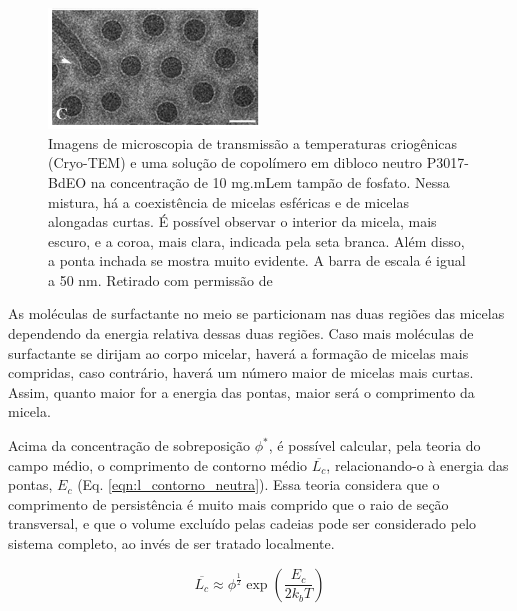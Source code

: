 		\begin{figure}[h]
			\centering
			\includegraphics[width=0.5\textwidth]{imagens/artigos/Cryo_TEM_Pontas_Danino_2009}
			\caption{Imagens de microscopia de transmissão a temperaturas criogênicas (Cryo-TEM) e uma solução de copolímero em dibloco neutro P3017-BdEO na concentração de 10 mg.mL\menosUm em tampão de fosfato. Nessa mistura, há a coexistência de micelas esféricas e de micelas alongadas curtas. É possível observar o interior da micela, mais escuro, e a coroa, mais clara, indicada pela seta branca. Além disso, a ponta inchada se mostra muito evidente. A barra de escala é igual a 50 nm. Retirado com permissão de %
		}
			\label{fig:pontas_inchadas_danino2009}
		\end{figure} 
				
		As moléculas de surfactante no meio se particionam nas duas regiões das micelas dependendo da energia relativa dessas duas regiões. Caso mais moléculas de surfactante se dirijam ao corpo micelar, haverá a formação de micelas mais compridas, caso contrário, haverá um número maior de micelas mais curtas. Assim, quanto maior for a energia das pontas, maior será o comprimento da micela.
		
		Acima da concentração de sobreposição \(\phi^*\), é possível calcular, pela teoria do campo médio, o comprimento de contorno médio \(\overline{L_c}\), relacionando-o à energia das pontas, \(E_c\) (Eq. \ref{eqn:l_contorno_neutra}). Essa teoria considera que o comprimento de persistência é muito mais comprido que o raio de seção transversal, e que o volume excluído pelas cadeias pode ser considerado pelo sistema completo, ao invés de ser tratado localmente. %
		 
		
		\begin{equation}
			\overline{L_c} \approx \phi^{\frac{1}{2}} \exp \left(\dfrac{E_c}{2k_bT}\right)
			\label{eqn:l_contorno_neutra}
		\end{equation} %
		
